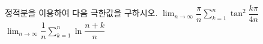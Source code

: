 정적분을 이용하여 다음 극한값을 구하시오.
 $\displaystyle\lim_{n\to\infty}\dfrac{\pi}{n}\sum_{k=1}^{n}\tan^2\dfrac{k\pi}{4n}$
 $\displaystyle\lim_{n\to\infty}\dfrac{1}{n}\sum_{k=1}^{n}\ln\dfrac{n+k}{n}$
